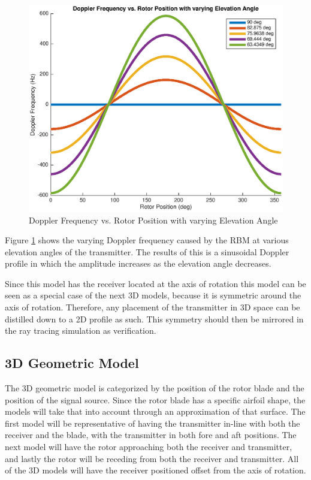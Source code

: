 \begin{figure}
	\begin{center}
		\includegraphics[width=15cm]{images/background/2d_theoretical_doppler_profile.eps}
		\caption{Doppler Frequency vs. Rotor Position with varying Elevation Angle}
		\label{fig:2D_theoretical_doppler}
	\end{center}
\end{figure}

Figure \ref{fig:2D_theoretical_doppler} shows the varying Doppler frequency caused by the RBM at various elevation angles of the transmitter. The results of this is a sinusoidal Doppler profile in which the amplitude increases as the elevation angle decreases. 

Since this model has the receiver located at the axis of rotation this model can be seen as a special case of the next 3D models, because it is symmetric around the axis of rotation. Therefore, any placement of the transmitter in 3D space can be distilled down to a 2D profile as such. This symmetry should then be mirrored in the ray tracing simulation as verification.

\subsection{3D Geometric Model}
The 3D geometric model is categorized by the position of the rotor blade and the position of the signal source. Since the rotor blade has a specific airfoil shape, the models will take that into account through an approximation of that surface. The first model will be representative of having the transmitter in-line with both the receiver and the blade, with the transmitter in both fore and aft positions. The next model will have the rotor approaching both the receiver and transmitter, and lastly the rotor will be receding from both the receiver and transmitter. All of the 3D models will have the receiver positioned offset from the axis of rotation.

